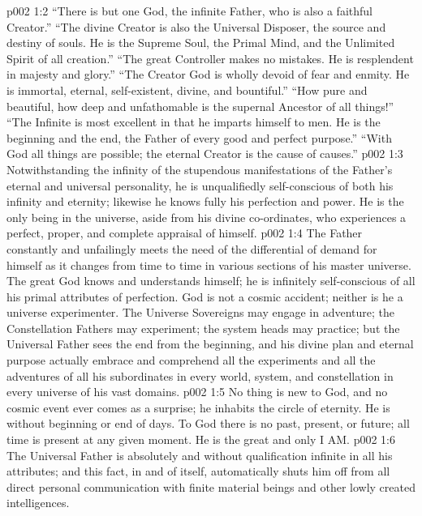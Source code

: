 \vs p002 1:2 “There is but one God, the infinite Father, who is also a faithful Creator.” “The divine Creator is also the Universal Disposer, the source and destiny of souls. He is the Supreme Soul, the Primal Mind, and the Unlimited Spirit of all creation.” “The great Controller makes no mistakes. He is resplendent in majesty and glory.” “The Creator God is wholly devoid of fear and enmity. He is immortal, eternal, self\hyp{}existent, divine, and bountiful.” “How pure and beautiful, how deep and unfathomable is the supernal Ancestor of all things!” “The Infinite is most excellent in that he imparts himself to men. He is the beginning and the end, the Father of every good and perfect purpose.” “With God all things are possible; the eternal Creator is the cause of causes.”
\pc \vs p002 1:3 Notwithstanding the infinity of the stupendous manifestations of the Father’s eternal and universal personality, he is unqualifiedly self\hyp{}conscious of both his infinity and eternity; likewise he knows fully his perfection and power. He is the only being in the universe, aside from his divine co\hyp{}ordinates, who experiences a perfect, proper, and complete appraisal of himself.
\vs p002 1:4 The Father constantly and unfailingly meets the need of the differential of demand for himself as it changes from time to time in various sections of his master universe. The great God knows and understands himself; he is infinitely self\hyp{}conscious of all his primal attributes of perfection. God is not a cosmic accident; neither is he a universe experimenter. The Universe Sovereigns may engage in adventure; the Constellation Fathers may experiment; the system heads may practice; but the Universal Father sees the end from the beginning, and his divine plan and eternal purpose actually embrace and comprehend all the experiments and all the adventures of all his subordinates in every world, system, and constellation in every universe of his vast domains.
\vs p002 1:5 No thing is new to God, and no cosmic event ever comes as a surprise; he inhabits the circle of eternity. He is without beginning or end of days. To God there is no past, present, or future; all time is present at any given moment. He is the great and only I AM.
\pc \vs p002 1:6 The Universal Father is absolutely and without qualification infinite in all his attributes; and this fact, in and of itself, automatically shuts him off from all direct personal communication with finite material beings and other lowly created intelligences.
